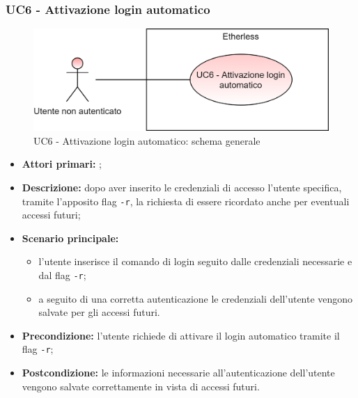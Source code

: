 \subsubsection{UC6 - Attivazione login automatico}
\begin{figure}[h]
	\centering
	\includegraphics[scale=\ucs]{./res/img/UC6G.png}
	\caption {UC6 - Attivazione login automatico: schema generale}
\end{figure}
\begin{itemize}
	\item \textbf{Attori primari:} \una{};
	\item \textbf{Descrizione:} dopo aver inserito le credenziali di accesso l’utente specifica, tramite l’apposito flag \texttt{-r}, la richiesta di essere ricordato anche per eventuali accessi futuri;
	\item \textbf{Scenario principale:} 
	\begin{itemize}
		\item l’utente inserisce il comando di login seguito dalle credenziali necessarie e dal flag \texttt{-r};
		\item a seguito di una corretta autenticazione le credenziali dell’utente vengono salvate per gli accessi futuri.
	\end{itemize}
	\item \textbf{Precondizione:} l’utente richiede di attivare il login automatico tramite il flag \texttt{-r};
	\item \textbf{Postcondizione:} le informazioni necessarie all’autenticazione dell’utente vengono salvate correttamente in vista di accessi futuri.
\end{itemize}